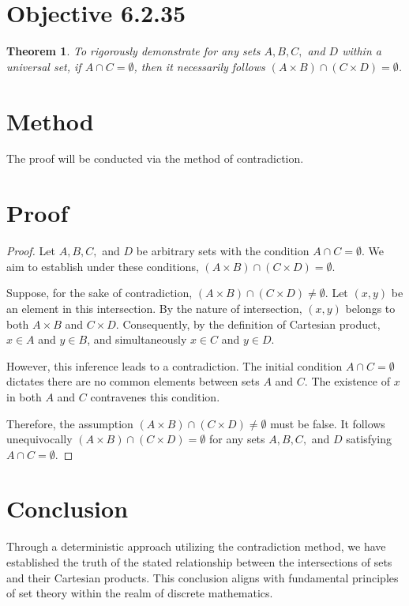 \documentclass[12pt]{article}
\newtheorem{theorem}{Theorem}
\begin{document}
\section*{Objective 6.2.35}
\begin{theorem}To rigorously demonstrate for any sets \( A, B, C, \) and \( D \) within a universal set, if \( A \cap C = \emptyset \), then it necessarily follows \( (A \times B) \cap (C \times D) = \emptyset \).\end{theorem}

\section*{Method}
The proof will be conducted via the method of contradiction.

\section*{Proof}\begin{proof}
Let \( A, B, C, \) and \( D \) be arbitrary sets with the condition \( A \cap C = \emptyset \). We aim to establish under these conditions, \( (A \times B) \cap (C \times D) = \emptyset \).

Suppose, for the sake of contradiction, \( (A \times B) \cap (C \times D) \neq \emptyset \). Let \( (x, y) \) be an element in this intersection. By the nature of intersection, \( (x, y) \) belongs to both \( A \times B \) and \( C \times D \). Consequently, by the definition of Cartesian product, \( x \in A \) and \( y \in B \), and simultaneously \( x \in C \) and \( y \in D \).

However, this inference leads to a contradiction. The initial condition \( A \cap C = \emptyset \) dictates there are no common elements between sets \( A \) and \( C \). The existence of \( x \) in both \( A \) and \( C \) contravenes this condition.

Therefore, the assumption \( (A \times B) \cap (C \times D) \neq \emptyset \) must be false. It follows unequivocally \( (A \times B) \cap (C \times D) = \emptyset \) for any sets \( A, B, C, \) and \( D \) satisfying \( A \cap C = \emptyset \).
\end{proof}

\section*{Conclusion}
Through a deterministic approach utilizing the contradiction method, we have established the truth of the stated relationship between the intersections of sets and their Cartesian products. This conclusion aligns with fundamental principles of set theory within the realm of discrete mathematics.
\end{document}
